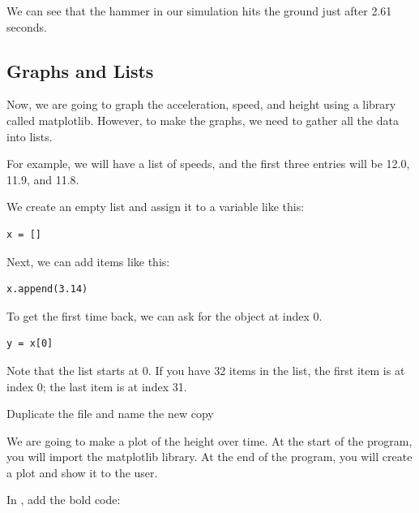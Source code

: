 We can see that the hammer in our simulation hits the ground just
after 2.61 seconds.

\subsection{Graphs and Lists}

Now, we are going to graph the acceleration, speed, and height using a
library called matplotlib. However, to make the graphs, we
need to gather all the data into lists.

For example, we will have a list of speeds, and the first three
entries will be 12.0, 11.9, and 11.8.

We create an empty list and assign it to a variable like this:
\begin{Verbatim}
x = []
\end{Verbatim}

Next, we can add items like this:
\begin{Verbatim}
x.append(3.14)
\end{Verbatim}

To get the first time back, we can ask for the object at index 0.
\begin{Verbatim}
y = x[0]
\end{Verbatim}
Note that the list starts at 0. If you have 32 items in the list,
the first item is at index 0; the last item is at index 31.

Duplicate the file  and name the new copy 

We are going to make a plot of the height over time. At the start of the 
program, you will import the matplotlib library.  At the end of the program, 
you will create a plot and show it to the user.

In , add the bold code:

